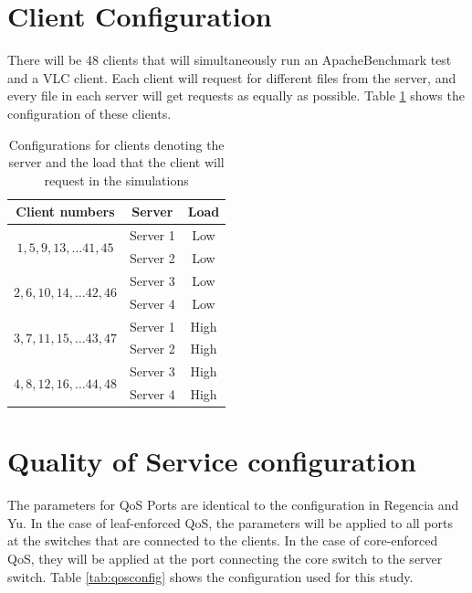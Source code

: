 \section{Client Configuration}
There will be 48 clients that will simultaneously run an ApacheBenchmark test and a VLC client. Each client will request for different files from the server, and every file in each server will get requests as equally as possible. Table \ref{tab:clientconfig} shows the configuration of these clients.

\begin{table}[htbp]
    \centering
    \begin{tabular}{ccc}
    \toprule
        Client numbers & Server & Load\\
    \midrule
        \multirow{2}{*}{$1, 5, 9, 13, \dots 41, 45$}  & Server 1 & Low \\
        & Server 2 & Low \\ \hline
        \multirow{2}{*}{$2, 6, 10, 14, \dots 42, 46$}  & Server 3 & Low \\
        & Server 4 & Low \\ \hline
        \multirow{2}{*}{$3, 7, 11, 15, \dots 43, 47$}  & Server 1 & High \\
        & Server 2 & High \\ \hline
        \multirow{2}{*}{$4, 8, 12, 16, \dots 44, 48$}  & Server 3 & High \\
        & Server 4 & High \\
    \bottomrule
    \end{tabular}
    \caption{Configurations for clients denoting the server and the load that the client will request in the simulations}
    \label{tab:clientconfig}
\end{table}

\section{Quality of Service configuration}
The parameters for QoS Ports are identical to the configuration in Regencia and Yu. In the case of leaf-enforced QoS, the parameters will be applied to all ports at the switches that are connected to the clients. In the case of core-enforced QoS, they will be applied at the port connecting the core switch to the server switch. Table \ref{tab:qosconfig} shows the configuration used for this study.

